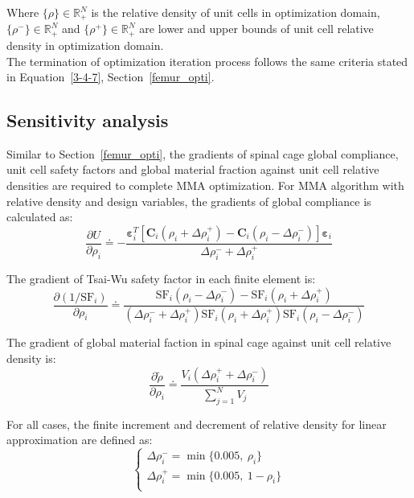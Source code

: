 \documentclass[12pt]{extbook}
\begin{document}
Where $\{\rho\}\in\mathbb{R}_+^{N}$ is the relative density of unit cells in optimization domain, $\{\rho^-\}\in\mathbb{R}_+^N$ and $\{\rho^+\}\in\mathbb{R}_+^N$ are lower and upper bounds of unit cell relative density in optimization domain.\\

The termination of optimization iteration process follows the same criteria stated in Equation~\ref{3-4-7}, Section~\ref{femur_opti}.\\

\subsection{Sensitivity analysis}

Similar to Section~\ref{femur_opti}, the gradients of spinal cage global compliance, unit cell safety factors and global material fraction against unit cell relative densities are required to complete MMA optimization. For MMA algorithm with relative density and design variables, the gradients of global compliance is calculated as:
\begin{equation}
\frac{\partial U}{\partial \rho_i} \doteq -\frac{\bm{\varepsilon}_i^T[\bm{C}_i(\rho_i + \Delta \rho_i^+) - \bm{C}_i(\rho_i - \Delta \rho_i^-)]\bm{\varepsilon}_i}{\Delta \rho_i^- + \Delta \rho_i^+}
\label{4-4-T4}
\end{equation}

The gradient of Tsai-Wu safety factor in each finite element is:
\begin{equation}
\frac{\partial (1/\text{SF}_i)}{\partial \rho_i} \doteq \frac{\text{SF}_i(\rho_i - \Delta \rho_i^-) - \text{SF}_i(\rho_i + \Delta \rho_i^+)}{(\Delta \rho_i^- + \Delta \rho_i^+) \text{SF}_i(\rho_i + \Delta \rho_i^+) \text{SF}_i(\rho_i - \Delta \rho_i^-)}
\label{4-4-T5}
\end{equation}

The gradient of global material faction in spinal cage against unit cell relative density is:
\begin{equation}
\frac{\partial \tilde{\rho}}{\partial \rho_i} \doteq \frac{V_i (\Delta \rho_i^++ \Delta \rho_i^-)}{\sum_{j=1}^N V_j}
\label{4-4-T6}
\end{equation}


For all cases, the finite increment and decrement of relative density for linear approximation are defined as:
\begin{equation}
\left\{
\begin{array}{l}
\Delta \rho_i^- = \min\{0.005,~\rho_i\}\\
\Delta \rho_i^+ = \min\{0.005,~1 - \rho_i\}\\
\end{array}
\right.
\label{4-4-T10}
\end{equation}
\end{document}

